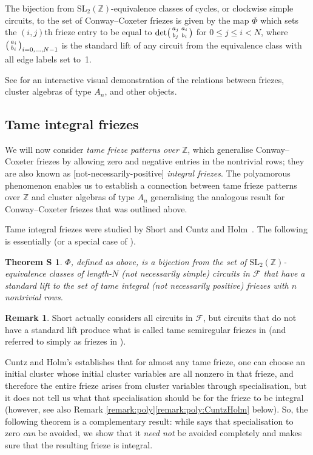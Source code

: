 \documentclass[12pt]{article}
\newtheorem*{theoremS}{Theorem \hypertarget{thm:s}{S}}
\theoremstyle{definition}
\newtheorem{remark}{Remark}
\newcommand{\Z}{\mathbb{Z}}
\newcommand{\SL}[1]{\ensuremath{\mathrm{SL}_{#1}}}
\newcommand{\F}{\mathscr{F}}
\begin{document}
The bijection from $\SL2(\Z)$-equivalence classes of cycles, or clockwise simple circuits, to the set of Conway--Coxeter friezes is given by the map $\Phi$ which sets the $(i,j)$th frieze entry to be equal to $\det\begin{psmallmatrix}a_j&a_i\\b_j&b_i\end{psmallmatrix}$ for $0\leqslant j\leqslant i<N$, where $\begin{psmallmatrix}a_i\\b_i\end{psmallmatrix}_{i=0,\dots,N-1}$ is the standard lift of any circuit from the equivalence class with all edge labels set to~1.

See \cite{ourApp} for an interactive visual demonstration of the relations between friezes, cluster algebras of type $A_n$, and other objects.

\subsection{Tame integral friezes}
We will now consider \emph{tame frieze patterns over $\Z$}, which generalise Conway--Coxeter friezes by allowing zero and negative entries in the nontrivial rows; they are also known as [not-necessarily-positive] \emph{integral friezes}. The polyamorous phenomenon enables us to establish a connection between tame frieze patterns over $\Z$ and cluster algebras of type $A_n$ generalising the analogous result for Conway--Coxeter friezes that was outlined above.

Tame integral friezes were studied by Short \cite{sl2short} and Cuntz and Holm~\cite{CuntzHolmFriezes}. The following is essentially \cite[Theorem 1.6]{sl2short} (or a special case of \cite[Theorem 1.3]{OUmodular}).
\begin{theoremS}
$\Phi$, defined as above, is a bijection from the set of $\SL2(\Z)$-equi\-valence classes of length-$N$ (not necessarily simple) circuits in $\F$ that have a standard lift to the set of tame integral (not necessarily positive) friezes with $n$ nontrivial rows.
\end{theoremS}
\begin{remark}
Short actually considers all circuits in $\F$, but circuits that do not have a standard lift produce what is called tame semiregular friezes in \cite{OUmodular} (and referred to simply as friezes in \cite{sl2short}).
\end{remark}

Cuntz and Holm's \cite[Theorem 5.4]{CuntzHolmFriezes} establishes that for almost any tame frieze, one can choose an initial cluster whose initial cluster variables are all nonzero in that frieze, and therefore the entire frieze arises from cluster variables through specialisation, but it does not tell us what that specialisation should be for the frieze to be integral (however, see also Remark \ref{remark:poly}\ref{remark:poly:CuntzHolm} below). So, the following theorem is a complementary result: while \cite[Theorem 5.4]{CuntzHolmFriezes} says that specialisation to zero \emph{can} be avoided, we show that it \emph{need not} be avoided completely and makes sure that the resulting frieze is integral.
\end{document}
